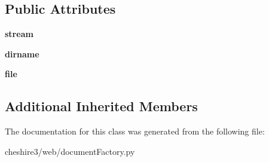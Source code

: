 \subsection*{Public Attributes}
\begin{DoxyCompactItemize}
\item 
\hypertarget{classcheshire3_1_1web_1_1document_factory_1_1_ftp_document_stream_a331bd152cf2151c62d31bd37f49ddae3}{{\bfseries stream}}\label{classcheshire3_1_1web_1_1document_factory_1_1_ftp_document_stream_a331bd152cf2151c62d31bd37f49ddae3}

\item 
\hypertarget{classcheshire3_1_1web_1_1document_factory_1_1_ftp_document_stream_acd4f503665d9d6abc59ec626c729217a}{{\bfseries dirname}}\label{classcheshire3_1_1web_1_1document_factory_1_1_ftp_document_stream_acd4f503665d9d6abc59ec626c729217a}

\item 
\hypertarget{classcheshire3_1_1web_1_1document_factory_1_1_ftp_document_stream_ace4196652ae8891c2483432b961ecff4}{{\bfseries file}}\label{classcheshire3_1_1web_1_1document_factory_1_1_ftp_document_stream_ace4196652ae8891c2483432b961ecff4}

\end{DoxyCompactItemize}
\subsection*{Additional Inherited Members}


The documentation for this class was generated from the following file\-:\begin{DoxyCompactItemize}
\item 
cheshire3/web/document\-Factory.\-py\end{DoxyCompactItemize}
